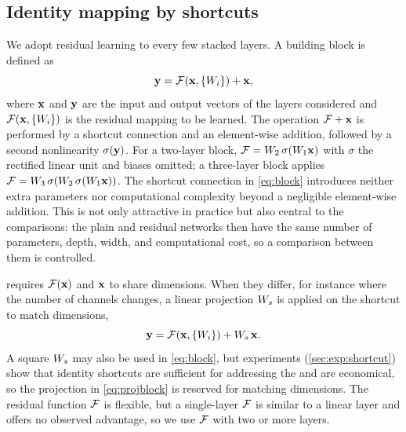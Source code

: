 \subsection{Identity mapping by shortcuts}
\label{sec:method:shortcut}
We adopt residual learning to every few stacked layers. A building block is defined as
\begin{equation}
  \mathbf{y} = \mathcal{F}(\mathbf{x}, \{W_i\}) + \mathbf{x}, \label{eq:block}
\end{equation}
where $\mathbf{x}$ and $\mathbf{y}$ are the input and output vectors of the layers considered and
$\mathcal{F}(\mathbf{x}, \{W_i\})$ is the residual mapping to be learned. The operation
$\mathcal{F} + \mathbf{x}$ is performed by a shortcut connection and an element-wise addition,
followed by a second nonlinearity $\sigma(\mathbf{y})$. For a two-layer block,
$\mathcal{F} = W_2\,\sigma(W_1 \mathbf{x})$ with $\sigma$ the rectified linear unit and biases
omitted; a three-layer block applies $\mathcal{F} = W_3\,\sigma(W_2\,\sigma(W_1 \mathbf{x}))$. The
shortcut connection in \cref{eq:block} introduces neither extra parameters nor
computational complexity beyond a negligible element-wise addition. This is not only
attractive in practice but also central to the comparisons: the plain and residual
networks then have the same number of parameters, depth, width, and computational cost,
so a comparison between them is controlled.

 requires $\mathcal{F}(\mathbf{x})$ and $\mathbf{x}$ to share dimensions. When they differ,
for instance where the number of channels changes, a linear projection $W_s$ is
applied on the shortcut to match dimensions,
\begin{equation}
  \mathbf{y} = \mathcal{F}(\mathbf{x}, \{W_i\}) + W_s\,\mathbf{x}. \label{eq:projblock}
\end{equation}
A square $W_s$ may also be used in \cref{eq:block}, but experiments
(\cref{sec:exp:shortcut}) show that identity shortcuts are sufficient for addressing the
\degprob and are economical, so the projection in \cref{eq:projblock} is reserved for
matching dimensions. The residual function $\mathcal{F}$ is flexible, but a single-layer
$\mathcal{F}$ is similar to a linear layer and offers no observed advantage, so we use
$\mathcal{F}$ with two or more layers.


